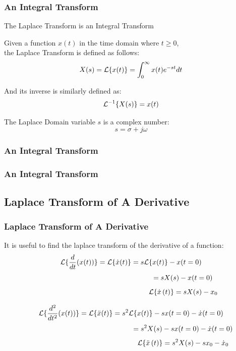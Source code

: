 \documentclass[fleqn]{beamer} %
\newcommand{\sectionIsubsectionItitle}{An Integral Transform}
\newcommand{\sectionIsubsectionIItitle}{Laplace Transform of A Derivative}
\begin{document}
			\begin{frame}
				\frametitle{\sectionIsubsectionItitle}
				\bigskip

 				The Laplace Transform is an Integral Transform

				Given a function $x(t)$ in the time domain where $t\geq0$, \\ the Laplace Transform is defined as follows: \\

				\[ X(s)=\Lagr{\{x(t)\}}=\displaystyle\int_0^{\infty} x(t)e^{-st}dt \]

				And its inverse is similarly defined as: \\

				\[ \Lagr^{-1}{\{X(s)\}}=x(t) \]

				The Laplace Domain variable $s$ is a complex number: \[ s=\sigma+j\omega \]
	
				\btVFill
			\end{frame}

			\begin{frame}
				\frametitle{\sectionIsubsectionItitle}
				\bigskip

	
 
  
				\btVFill
			\end{frame}

			\begin{frame}
				\frametitle{\sectionIsubsectionItitle}
				\bigskip


				\btVFill
			\end{frame}

		



		\subsection{\sectionIsubsectionIItitle}\label{sectionIsubsectionII}

			\begin{frame}
				\frametitle{\sectionIsubsectionIItitle}
				\bigskip

					It is useful to find the laplace transform of the derivative of a function: 
					\[ \Lagr{\{\frac{d}{dt}(x(t))\} }=\Lagr{\{\dot{x}(t)\}} =s\Lagr{\{x(t)\} }-x(t=0) \]
					\[ \hspace{52mm} =sX(s)-x(t=0) \]
					\[ \hspace{52mm}\Lagr{\{ \dot{x} \left(t\right) \}} =sX(s)-x_0 \]

					\[ \Lagr{\{\frac{d^2}{dt^2}(x(t))\} }=\Lagr{\{\ddot{x}(t)\}} = s^2\Lagr{\{x(t)\} }-sx(t=0)-\dot{x}(t=0) \]
					\[ \hspace{52mm} = s^2X(s)-sx(t=0)-\dot{x}(t=0) \]
					\[ \hspace{52mm} \Lagr{\{ \ddot{x} \left(t\right) \}}= s^2X(s)-sx_0-\dot{x}_0  \]

				\btVFill
			\end{frame}
\end{document}
